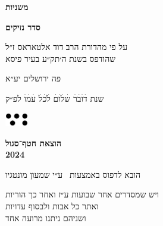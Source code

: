 \documentclass[14pt, a5paper, twoside, extrafontsizes]{memoir}
\begin{document}
\frontmatter
\pagestyle{myheadings}
\thispagestyle{mytitlepage}
\begin{hebrew}
{\Centering

  {\huge\bfseries משניות}

  {\LARGE\bfseries סדר נזיקים}

  \vspace{1em}

  \vspace{0.5em}
  על פי מהדורת הרב דוד אלטאראס ז״ל\\שהודפס בשנת ה׳תק״ע בעיר פיסא

    \vspace{8em}
    פה {\LARGE ירושלים} יע״א

    {\small שנת}
    {\Large דׄוׄבׄרׄ שׄלׄוׄםׄ לׄכׄלׄ עׄמׄוׄ} %
    {\small לפ״ק}

    \vspace{2em}
    \includegraphics[width=10mm]{hatafSegolLogoNoText.png}\\

    \vspace{.5em}
  {
    \bfseries הוצאת חטף־סגול\\2024

    {\footnotesize  הובא לדפוס באמצעות \XeLaTeX\ ע״י שמעון מונטגיו}

  }

}


\vspace{1em}
{
\parskip 2pt


\vspace{4pt}
 { \centering
   \small
       {\larger  ויש} שמסדרים אחר שבועות ע״ז ואחר כך הוריות\\
       ואתר כל אבות ולבסוף עדויות\\
       ושניהם ניתנו מרועה אחד}

}
\mainmatter
\thispagestyle{empty}


%
%
%
%
%
%
%
%
%



%
%

\end{hebrew}
\end{document}
